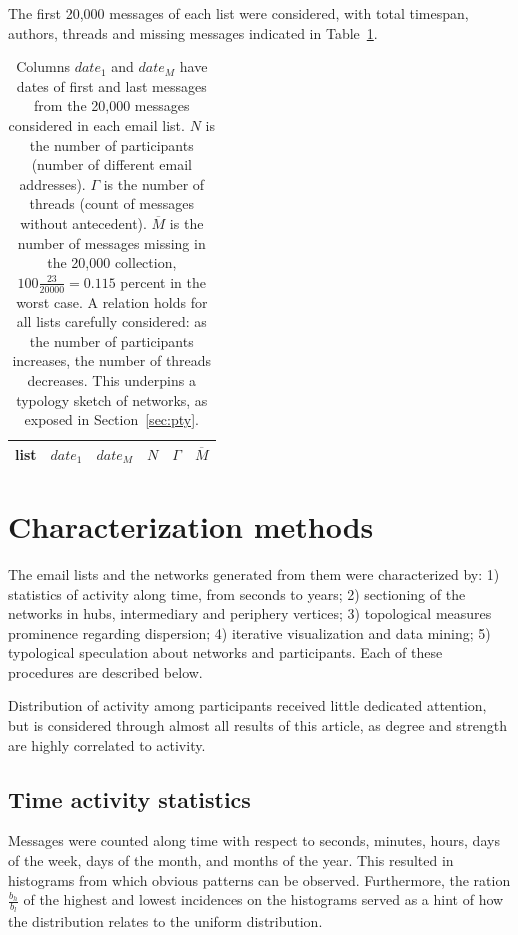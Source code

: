 \documentclass[%
 aip,
 jmp,%
 amsmath,amssymb,
 reprint,%
]{revtex4-1}
\begin{document}
 The first 20,000 messages of each list were considered, with total timespan, authors, threads and missing messages indicated in Table~\ref{tab:genLists}.

\begin{table}
  \centering
  \caption{Columns $date_1$ and $date_M$ have dates of first and last messages from the 20,000 messages considered in each email list.
$N$ is the number of participants (number of different email addresses).
$\Gamma$ is the number of threads (count of messages without antecedent).
$\overline{M}$ is the number of messages missing in the 20,000 collection, $100\frac{23}{20000}=0.115$ percent in the worst case.
A relation holds for all lists carefully considered: as the number of participants increases, the number of threads decreases.
This underpins a typology sketch of networks, as exposed in Section~\ref{sec:pty}.}
  \label{tab:genLists}
  \begin{tabular}{|l|c|c|c|c|c|}\hline
list & $date_1$ & $date_{M}$    & $N$  & $\Gamma$ & $\overline{M}$ \\\hline
	  
  \end{tabular}
\end{table}


\section{Characterization methods}\label{sec:carac}
The email lists and the networks generated from them were characterized by: 1) statistics of activity along time, from seconds to years; 2) sectioning of the networks in hubs, intermediary and periphery vertices; 3) topological measures prominence regarding dispersion; 4) iterative visualization and data mining; 5) typological speculation about networks and participants.
Each of these procedures are described below.

Distribution of activity among participants received little dedicated attention, but is considered through almost all results of this article, as degree and strength are highly correlated to activity.

\subsection{Time activity statistics}\label{sec:mtime}
  Messages were counted along time with respect to seconds, minutes, hours, days of the week, days of the month, and months of the year. This resulted in histograms from which obvious patterns can be observed. Furthermore, the ration $\frac{b_h}{b_l}$ of the highest and lowest incidences on the histograms served as a hint of how the distribution relates to the uniform distribution.
  
\end{document}
